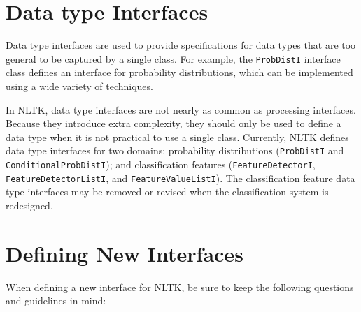 \documentclass[11pt]{article}
\begin{document}
\section{Data type Interfaces}

Data type interfaces are used to provide specifications for data types
that are too general to be captured by a single class.  For example,
the \texttt{ProbDistI} interface class defines an interface for
probability distributions, which can be implemented using a wide
variety of techniques.

In NLTK, data type interfaces are not nearly as common as processing
interfaces.  Because they introduce extra complexity, they should only
be used to define a data type when it is not practical to use a single
class.  Currently, NLTK defines data type interfaces for two domains:
probability distributions (\texttt{ProbDistI} and
\texttt{ConditionalProbDistI}); and classification features
(\texttt{FeatureDetectorI}, \texttt{FeatureDetectorListI}, and
\texttt{FeatureValueListI}).  The classification feature data type
interfaces may be removed or revised when the classification system is
redesigned.

\section{Defining New Interfaces}

When defining a new interface for NLTK, be sure to keep the following
questions and guidelines in mind:
\end{document}
